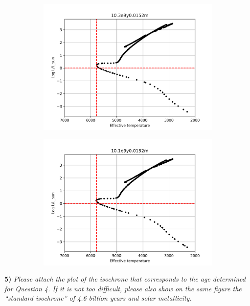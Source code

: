 \documentclass[11pt,a4paper]{article}
\begin{document}
\begin{figure}[h]
        \begin{subfigure}{.5\textwidth}
            \centering
            \includegraphics[width=\linewidth]{figures/10.3e9y0.0152m}
            \label{fig:sub3}
        \end{subfigure}%
        \begin{subfigure}{.5\textwidth}
            \centering
            \includegraphics[width=\linewidth]{figures/10.1e9y0.0152m}
            \label{fig:sub4}
        \end{subfigure}%
        \label{fig:test}
    \end{figure}
    
    \clearpage
    
    \textbf{5)} \textit{Please attach the plot of the isochrone that corresponds to the age determined for Question 4.
    If it is not too difficult, please also show on the same figure the “standard isochrone” of 4.6 billion years and solar metallicity.}
\end{document}
